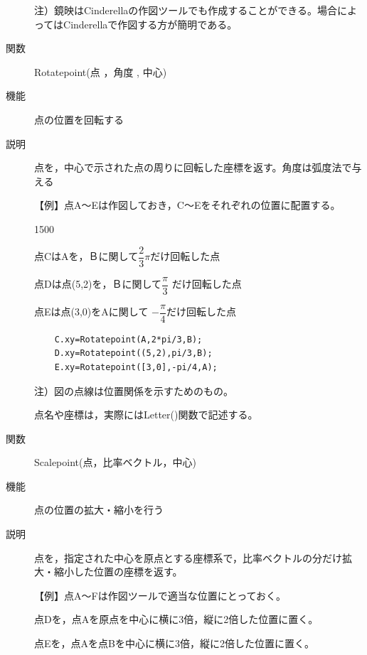 \documentclass[papersize,a4paper,12pt,uplatex]{jsarticle}
\begin{document}
\begin{description}
\vspace{\baselineskip}
注）鏡映はCinderellaの作図ツールでも作成することができる。場合によってはCinderellaで作図する方が簡明である。

\vspace{\baselineskip}
\hypertarget{rotatepoint}{}
\item[関数]  Rotatepoint(点 ，角度 , 中心)
\item[機能]  点の位置を回転する
\item[説明]  点を，中心で示された点の周りに回転した座標を返す。角度は弧度法で与える

\vspace{\baselineskip}
【例】点A〜Eは作図しておき，C〜Eをそれぞれの位置に配置する。

\begin{layer}{150}{0}
\end{layer}
\begin{spacing}{1.5}
点CはAを，Ｂに関して$\dfrac{2}{3}\pi $だけ回転した点
    
点Dは点(5,2)を，Ｂに関して$\dfrac{\pi}{3}$ だけ回転した点
\end{spacing}
点Eは点(3,0)をAに関して $-\dfrac{\pi}{4} $だけ回転した点

\begin{verbatim}
    C.xy=Rotatepoint(A,2*pi/3,B);
    D.xy=Rotatepoint((5,2),pi/3,B);
    E.xy=Rotatepoint([3,0],-pi/4,A);
\end{verbatim}
注）図の点線は位置関係を示すためのもの。

点名や座標は，実際にはLetter()関数で記述する。

\vspace{\baselineskip}
\hypertarget{scalepoint}{}
\item[関数]  Scalepoint(点，比率ベクトル，中心)
\item[機能]  点の位置の拡大・縮小を行う
\item[説明]  点を，指定された中心を原点とする座標系で，比率ベクトルの分だけ拡大・縮小した位置の座標を返す。

\vspace{\baselineskip}
【例】点A〜Fは作図ツールで適当な位置にとっておく。

点Dを，点Aを原点を中心に横に3倍，縦に2倍した位置に置く。

点Eを，点Aを点Bを中心に横に3倍，縦に2倍した位置に置く。


\end{description}
\end{document}
